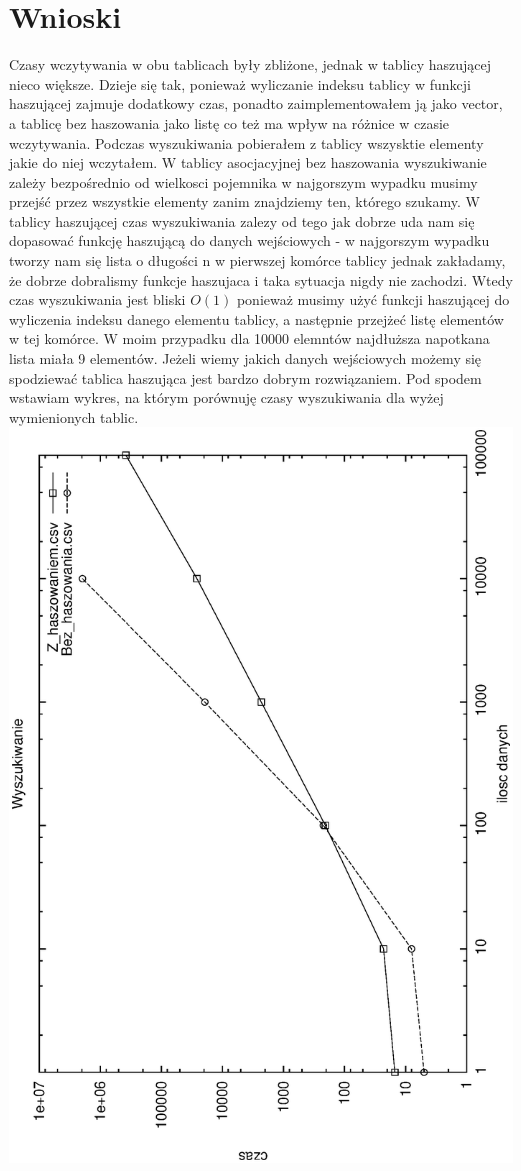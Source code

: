 \documentclass[a4paper,11pt]{report}
\begin{document}
\chapter{Wnioski}
Czasy wczytywania w obu tablicach były zbliżone, jednak w tablicy haszującej nieco większe. Dzieje się tak, ponieważ wyliczanie indeksu tablicy w funkcji haszującej zajmuje dodatkowy czas, ponadto zaimplementowałem ją jako vector, a tablicę bez haszowania jako listę co też ma wpływ na różnice w czasie wczytywania. Podczas wyszukiwania pobierałem z tablicy wszysktie elementy jakie do niej wczytałem. W tablicy asocjacyjnej bez haszowania wyszukiwanie zależy bezpośrednio od wielkosci pojemnika w najgorszym wypadku musimy przejść przez wszystkie elementy zanim znajdziemy ten, którego szukamy. W tablicy haszującej czas wyszukiwania zalezy od tego jak dobrze uda nam się dopasować funkcję haszującą do danych wejściowych - w najgorszym wypadku tworzy nam się lista o długości n w pierwszej komórce tablicy jednak zakładamy, że dobrze dobralismy funkcje haszujaca i taka sytuacja nigdy nie zachodzi. Wtedy czas wyszukiwania jest bliski $O(1)$ ponieważ musimy użyć funkcji haszującej do wyliczenia indeksu danego elementu tablicy, a następnie przejżeć listę elementów w tej komórce. W moim przypadku dla 10000 elemntów najdłuższa napotkana lista miała 9 elementów. Jeżeli wiemy jakich danych wejściowych możemy się spodziewać tablica haszująca jest bardzo dobrym rozwiązaniem. Pod spodem wstawiam wykres, na którym porównuję czasy wyszukiwania dla wyżej wymienionych tablic.
\includegraphics[angle=270, scale = 0.5]{wykresy/wyszukiwanie_porownanie.eps}
\end{document}
